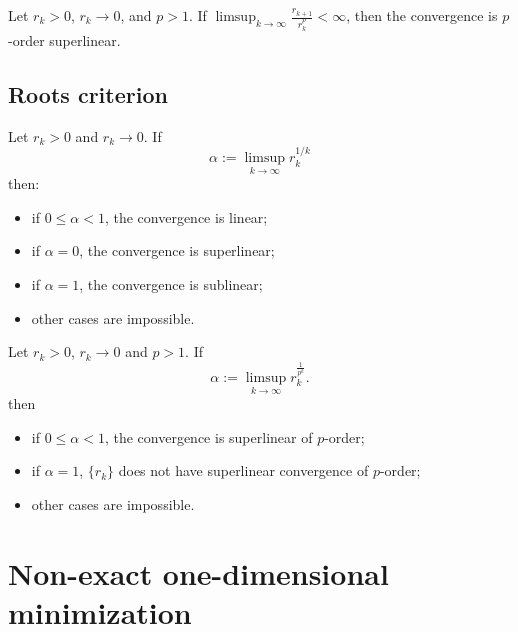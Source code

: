 \begin{theorem}
Let $r_k >0$, $r_k \to 0$, and $p >1$. If
$\limsup_{k\to \infty} \frac{r_{k+1}}{r_k^{p}} < \infty$, then the convergence is $p$-order
superlinear.
\end{theorem}
\subsection{Roots criterion}
\begin{theorem}
Let $r_k>0$ and $r_k\to 0$. If 
\[
  \alpha := \limsup_{k\to\infty} r_k^{1/k}
\]
then:
\begin{itemize}
  \item if $0\le\alpha<1$, the convergence is linear;
  \item if $\alpha=0$, the convergence is superlinear;
  \item if $\alpha=1$, the convergence is sublinear;
  \item other cases are impossible.
\end{itemize}
\end{theorem}

\begin{theorem}
  Let $r_k > 0$, $r_k \to 0$ and $p > 1$. If 
  \[
  \alpha := \limsup_{k \to  \infty} r_k^{\frac{1}{p^{k}}}
  .\] 
then 
\begin{itemize}
  \item if $0\le \alpha < 1$, the convergence is superlinear of $p$-order;
  \item if $\alpha =1$, $\{r_k\}$ does not have superlinear convergence of $p$-order;
  \item other cases are impossible.
\end{itemize}
\end{theorem}

\section{Non-exact one-dimensional minimization}


